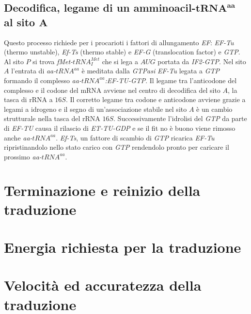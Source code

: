 \subsection{Decodifica, legame di un amminoacil-$\mathbf{tRNA^{aa}}$ al sito $\mathbf{A}$}
Questo processo richiede per i procarioti i fattori di allungamento \emph{EF}: \emph{EF-Tu} (thermo unstable), \emph{Ef-Ts} (thermo stable) e \emph{EF-G} (translocation factor) e \emph{GTP}. Al sito 
$P$ si trova \emph{fMet-$tRNA_I^{Met}$} che si lega a $AUG$ portata da \emph{IF2-GTP}. Nel sito $A$ l'entrata di \emph{aa-$tRNA^{aa}$} \`e meditata dalla \emph{GTPasi} \emph{EF-Tu} legata a 
\emph{GTP} formando il complesso \emph{aa-$tRNA^{aa}$:EF-TU-GTP}. Il legame tra l'anticodone del complesso e il codone del mRNA avviene nel centro di decodifica del sito $A$, la tasca di rRNA a $16S$. 
Il corretto legame tra codone e anticodone avviene grazie a legami a idrogeno e il segno di un'associazione stabile nel sito $A$ \`e un cambio strutturale nella tasca del rRNA $16S$. Successivamente
l'idrolisi del \emph{GTP} da parte di \emph{EF-TU} causa il rilascio di \emph{ET-TU-GDP} e se il fit no \`e buono viene rimosso anche \emph{aa-$tRNA^{aa}$}. \emph{Ef-Ts}, un fattore di scambio di 
\emph{GTP} ricarica \emph{EF-Tu} ripristinandolo nello stato carico con \emph{GTP} rendendolo pronto per caricare il prossimo \emph{aa-$tRNA^{aa}$}. 


\section{Terminazione e reinizio della traduzione}

\section{Energia richiesta per la traduzione}

\section{Velocit\`a ed accuratezza della traduzione}

